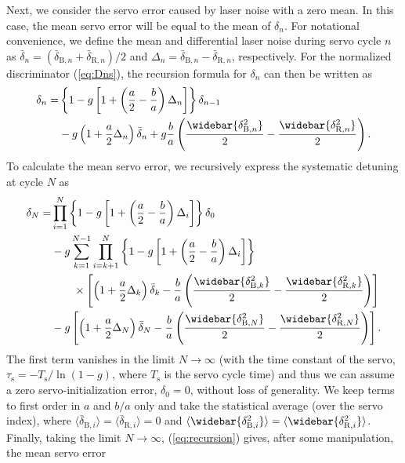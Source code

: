 \documentclass[10pt,a4paper]{iopart}
\newcommand{\eqref}[1]{(\ref{#1})}
\begin{document}
Next, we consider the servo error caused by laser noise with a zero mean.
In this case, the mean servo error will be equal to the mean of $\delta_n$.
For notational convenience, we define the mean and differential laser noise during servo cycle $n$ as $\bar{\delta}_n = (\bar{\delta}_{\mathrm{B},n} + \bar{\delta}_{\mathrm{R},n})/2$ and $\Delta_n = \bar{\delta}_{\mathrm{B},n} - \bar{\delta}_{\mathrm{R},n}$, respectively. For the normalized discriminator \eqref{eq:Dns}, the recursion formula for $\delta_n$ can then be written as
\begin{eqnarray}
\delta_n = & \left\{ 1-g \left[ 1 + \left( \frac{a}{2} - \frac{b}{a} \right) \Delta_{n} \right]\right\} \delta_{n-1} \nonumber \\
& - g \left(1+\frac{a}{2} \Delta_n\right) \bar{\delta}_{n} + g \frac{b}{a} \left( \frac{\widebar{\delta_{\mathrm{B},n}^2}}{2} - \frac{\widebar{\delta_{\mathrm{R},n}^2}}{2} \right).
\end{eqnarray}
To calculate the mean servo error, we recursively express the systematic detuning at cycle $N$ as
\begin{eqnarray}
\delta_N = & \prod_{i=1}^N \left\{ 1-g \left[ 1 + \left( \frac{a}{2} - \frac{b}{a} \right) \Delta_{i} \right]\right\} \delta_{0}  \nonumber \\
& - g \sum_{k=1}^{N-1} \prod_{i=k+1}^N \left\{ 1-g \left[ 1 + \left( \frac{a}{2} - \frac{b}{a} \right) \Delta_{i} \right]\right\} \nonumber \\
& \quad \quad \times \left[ \left(1+\frac{a}{2} \Delta_k\right) \bar{\delta}_{k} - \frac{b}{a} \left( \frac{\widebar{\delta_{\mathrm{B},k}^2}}{2} - \frac{\widebar{\delta_{\mathrm{R},k}^2}}{2} \right) \right] \nonumber \\
& - g \left[ \left(1+\frac{a}{2} \Delta_N\right) \bar{\delta}_{N} - \frac{b}{a} \left( \frac{\widebar{\delta_{\mathrm{B},N}^2}}{2} - \frac{\widebar{\delta_{\mathrm{R},N}^2}}{2} \right) \right]. \label{eq:recursion}
\end{eqnarray}
The first term vanishes in the limit $N \rightarrow \infty$ (with the time constant of the servo, $\tau_\mathrm{s} = -T_\mathrm{s}/\ln{(1-g)}$, where $T_\mathrm{s}$ is the servo cycle time) and thus we can assume a zero servo-initialization error,  $\delta_{0} = 0$, without loss of generality. We keep terms to first order in $a$ and $b/a$ only and  take the statistical average (over the servo index), where $\langle \bar{\delta}_{\mathrm{B},i}\rangle = \langle \bar{\delta}_{\mathrm{R},i}\rangle = 0$ and $\langle \widebar{\delta_{\mathrm{B},i}^2} \rangle = \langle \widebar{\delta_{\mathrm{R},i}^2} \rangle$. Finally, taking the limit $N \rightarrow \infty$, \eqref{eq:recursion} gives, after some manipulation, the mean servo error
\end{document}
